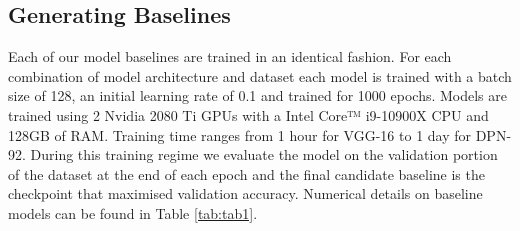 \documentclass{article}
\begin{document}
\subsection{Generating Baselines}
Each of our model baselines are trained in an identical fashion. For each combination of model architecture and dataset each model is trained with a batch size of 128, an initial learning rate of 0.1 and trained for 1000 epochs. Models are trained using 2 Nvidia 2080 Ti GPUs with a  Intel Core™ i9-10900X CPU and 128GB of RAM. Training time ranges from 1 hour for VGG-16 to 1 day for DPN-92. During this training regime we evaluate the model on the validation portion of the dataset at the end of each epoch and the final candidate baseline is the checkpoint that maximised validation accuracy. Numerical details on baseline models can be found in Table \ref{tab:tab1}.
\begin{table}[]
\centering
{}
\caption{Baseline models accuracy, train time and parameter size.}
\label{tab:tab1}
\end{table}
\end{document}
